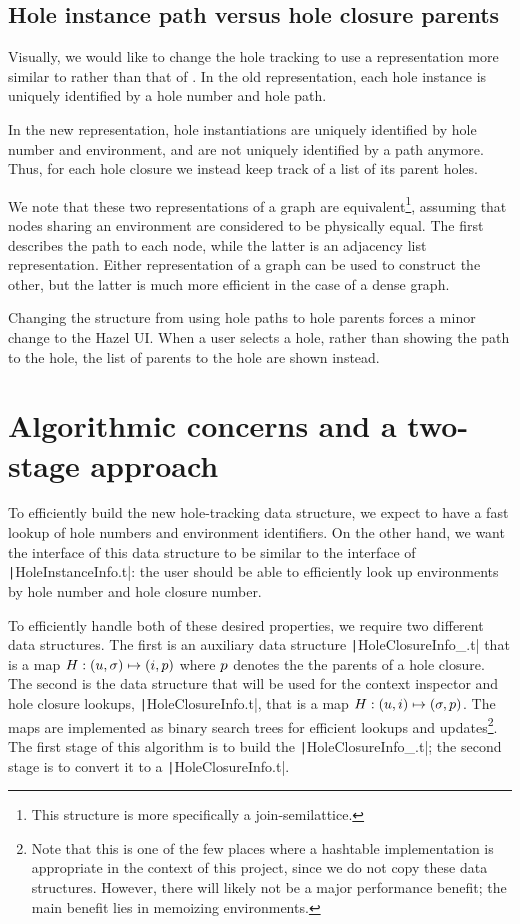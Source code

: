 \subsection{Hole instance path versus hole closure parents}
\label{sec:closure-parents}

Visually, we would like to change the hole tracking to use a representation more similar to  rather than that of . In the old representation, each hole instance is uniquely identified by a hole number and hole path.

In the new representation, hole instantiations are uniquely identified by hole number and environment, and are not uniquely identified by a path anymore. Thus, for each hole closure we instead keep track of a list of its parent holes.

We note that these two representations of a graph are equivalent\footnote{This structure is more specifically a join-semilattice.}, assuming that nodes sharing an environment are considered to be physically equal. The first describes the path to each node, while the latter is an adjacency list representation. Either representation of a graph can be used to construct the other, but the latter is much more efficient in the case of a dense graph.

Changing the structure from using hole paths to hole parents forces a minor change to the Hazel UI. When a user selects a hole, rather than showing the path to the hole, the list of parents to the hole are shown instead.

\section{Algorithmic concerns and a two-stage approach}
\label{sec:two-stage-renumber}

To efficiently build the new hole-tracking data structure, we expect to have a fast lookup of hole numbers and environment identifiers. On the other hand, we want the interface of this data structure to be similar to the interface of \texttt|HoleInstanceInfo.t|: the user should be able to efficiently look up environments by hole number and hole closure number.

To efficiently handle both of these desired properties, we require two different data structures. The first is an auxiliary data structure \texttt|HoleClosureInfo_.t| that is a map $H:(u,\sigma)\mapsto(i,p)$ where $p$ denotes the the parents of a hole closure. The second is the data structure that will be used for the context inspector and hole closure lookups, \texttt|HoleClosureInfo.t|, that is a map $H:(u,i)\mapsto(\sigma,p)$. The maps are implemented as binary search trees for efficient lookups and updates\footnote{Note that this is one of the few places where a hashtable implementation is appropriate in the context of this project, since we do not copy these data structures. However, there will likely not be a major performance benefit; the main benefit lies in memoizing environments.}. The first stage of this algorithm is to build the \texttt|HoleClosureInfo_.t|; the second stage is to convert it to a \texttt|HoleClosureInfo.t|.

